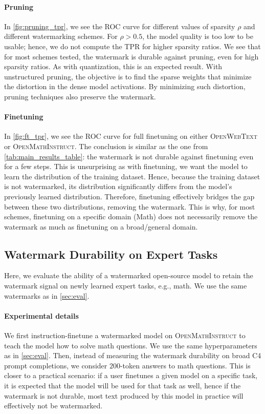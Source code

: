 


\paragraph{Pruning}
In \cref{fig:pruning_tpr}, we see the ROC curve for different values of sparsity $\rho$ and different watermarking schemes.  
For $\rho > 0.5$, the model quality is too low to be usable; hence, we do not compute the TPR for higher sparsity ratios.  
We see that for most schemes tested, the watermark is durable against pruning, even for high sparsity ratios.  
As with quantization, this is an expected result.  
With unstructured pruning, the objective is to find the sparse weights that minimize the distortion in the dense model activations.  
By minimizing such distortion, pruning techniques also preserve the watermark.




\paragraph{Finetuning}
In \cref{fig:ft_tpr}, we see the ROC curve for full finetuning on either \textsc{OpenWebText} or \textsc{OpenMathInstruct}.
The conclusion is similar as the one from \cref{tab:main_results_table}: the watermark is not durable against finetuning even for a few steps.
This is unsurprising as with finetuning, we want the model to learn the distribution of the training dataset.
Hence, because the training dataset is not watermarked, its distribution significantly differs from the model's previously learned distribution.
Therefore, finetuning effectively bridges the gap between these two distributions, removing the watermark.
This is why, for most schemes, finetuning on a specific domain (Math) does not necessarily remove the watermark as much as finetuning on a broad/general domain.

\subsection{Watermark Durability on Expert Tasks}
\label{ssec:task_specific_eval}

Here, we evaluate the ability of a watermarked open-source model to retain the watermark signal on newly learned expert tasks, e.g., math.
We use the same watermarks as in \cref{sec:eval}.

\paragraph{Experimental details}
We first instruction-finetune a watermarked model on \textsc{OpenMathInstruct} to teach the model how to solve math questions.  
We use the same hyperparameters as in \cref{sec:eval}.  
Then, instead of measuring the watermark durability on broad C4 prompt completions, we consider $200$-token answers to math questions.  
This is closer to a practical scenario: if a user finetunes a given model on a specific task, it is expected that the model will be used for that task as well, hence if the watermark is not durable, most text produced by this model in practice will effectively not be watermarked.

